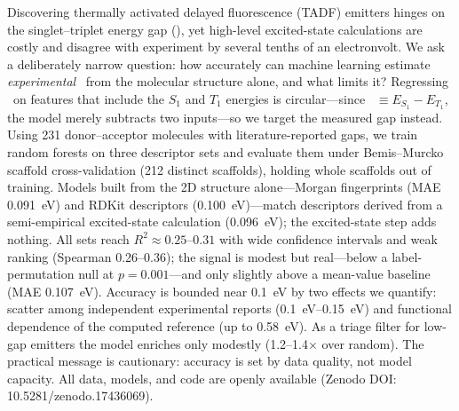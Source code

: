 
Discovering thermally activated delayed fluorescence (TADF) emitters hinges on the
singlet--triplet energy gap (\deltaest), yet high-level excited-state calculations are
costly and disagree with experiment by several tenths of an electronvolt.
%
We ask a deliberately narrow question: how accurately can machine learning estimate
\emph{experimental} \deltaest\ from the molecular structure alone, and what limits it?
%
Regressing \deltaest\ on features that include
the $S_1$ and $T_1$ energies is circular---since
\deltaest~$\equiv E_{S_1}-E_{T_1}$, the model merely subtracts two inputs---so we target
the measured gap instead.
%
Using \num{231} donor--acceptor molecules with literature-reported gaps, we train
random forests on three descriptor sets and evaluate them under Bemis--Murcko scaffold
cross-validation (\num{212} distinct scaffolds), holding whole scaffolds out of
training. Models built from the 2D structure alone---Morgan fingerprints
(MAE \qty{0.091}{\electronvolt}) and RDKit descriptors (\qty{0.100}{\electronvolt})---match
descriptors derived from a semi-empirical excited-state calculation
(\qty{0.096}{\electronvolt}); the excited-state step adds nothing.
%
All sets reach $R^2 \approx 0.25$--$0.31$ with wide confidence intervals and weak ranking
(Spearman \numrange{0.26}{0.36}); the signal is modest but real---below a label-permutation
null at $p = 0.001$---and only slightly above a mean-value baseline
(MAE \qty{0.107}{\electronvolt}).
%
Accuracy is bounded near \qty{0.1}{\electronvolt} by two effects we quantify: scatter
among independent experimental reports (\qtyrange{0.1}{0.15}{\electronvolt}) and
functional dependence of the computed reference (up to \qty{0.58}{\electronvolt}).
%
As a triage filter for low-gap emitters the model enriches only modestly
(\numrange{1.2}{1.4}$\times$ over random). The practical message is cautionary: accuracy is
set by data quality, not model capacity.
%
All data, models, and code are openly available (Zenodo DOI: 10.5281/zenodo.17436069).
